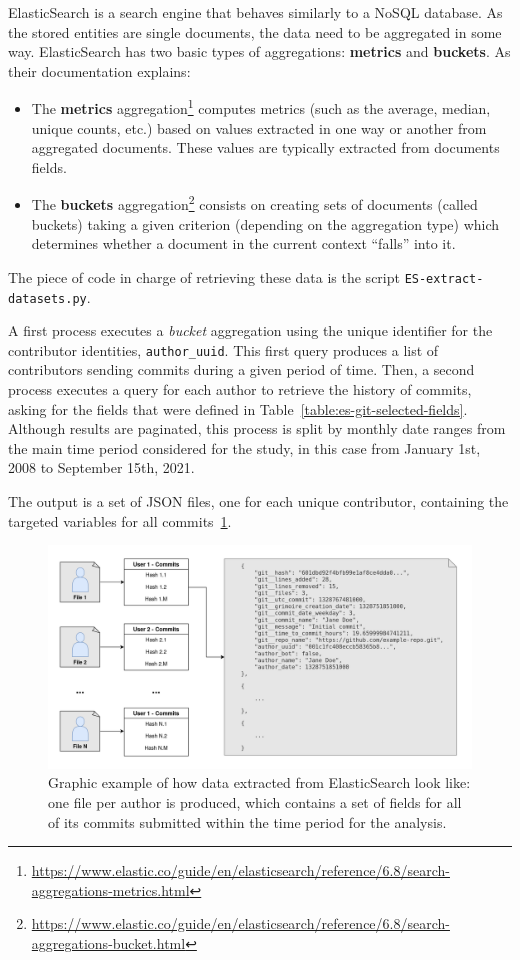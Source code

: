 \documentclass[a4paper, 12pt]{book}
\begin{document}
ElasticSearch is a search engine that behaves similarly to a NoSQL database. As the stored entities are single documents, the data need to be aggregated in some way. ElasticSearch has two basic types of aggregations: \textbf{metrics} and \textbf{buckets}. As their documentation explains:
\begin{itemize}
\item The \textbf{metrics} aggregation\footnote{\url{https://www.elastic.co/guide/en/elasticsearch/reference/6.8/search-aggregations-metrics.html}} computes metrics (such as the average, median, unique counts, etc.) based on values extracted in one way or another from aggregated documents. These values are typically extracted from documents fields.
\item The \textbf{buckets} aggregation\footnote{\url{https://www.elastic.co/guide/en/elasticsearch/reference/6.8/search-aggregations-bucket.html}} consists on creating sets of documents (called buckets) taking a given criterion (depending on the aggregation type) which determines whether a document in the current context ``falls'' into it.
\end{itemize} 

The piece of code in charge of retrieving these data is the script \texttt{ES-extract-datasets.py}.

A first process executes a \textit{bucket} aggregation using the unique identifier for the contributor identities, \texttt{author\_uuid}. This first query produces a list of contributors sending commits during a given period of time. Then, a second process executes a query for each author to retrieve the history of commits, asking for the fields that were defined in Table~\ref{table:es-git-selected-fields}. Although results are paginated, this process is split by monthly date ranges from the main time period considered for the study, in this case from January 1st, 2008 to September 15th, 2021.

The output is a set of JSON files, one for each unique contributor, containing the targeted variables for all commits~\ref{fig:example-users-commits-dataset}.

\begin{figure}
  \centering
  \includegraphics[width=16cm, keepaspectratio]{img/data-files-revelio-users-commits.drawio.png}
  \caption{Graphic example of how data extracted from ElasticSearch look like: one file per author is produced, which contains a set of fields for all of its commits submitted within the time period for the analysis.}
  \label{fig:example-users-commits-dataset}
\end{figure}
\end{document}
